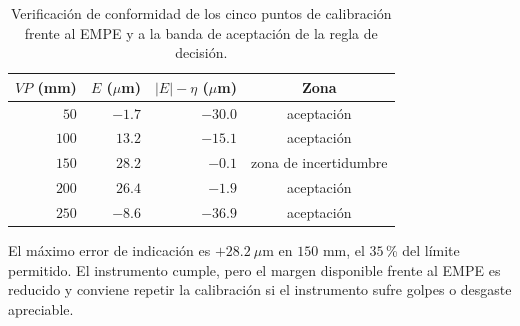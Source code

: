 \begin{table}[H]
\centering
\caption{Verificación de conformidad de los cinco puntos de calibración frente al
EMPE y a la banda de aceptación de la regla de decisión.}
\label{tab:pie-rey-conformidad}
\begin{tabular}{rrrc}
\toprule
$VP$ (mm) & $E$ ($\mu$m) & $|E| - \eta$ ($\mu$m) & Zona \\
\midrule
$50$  & $-1.7$ & $-30.0$ & aceptación \\
$100$ & $13.2$ & $-15.1$ & aceptación \\
$150$ & $28.2$ & $-0.1$   & zona de incertidumbre \\
$200$ & $26.4$ & $-1.9$   & aceptación \\
$250$ & $-8.6$ & $-36.9$ & aceptación \\
\bottomrule
\end{tabular}
\end{table}

El máximo error de indicación es $+28.2\ \mu\text{m}$ en $150$ mm, el $35$\,\% del
límite permitido. El instrumento cumple, pero el margen disponible frente al EMPE es
reducido y conviene repetir la calibración si el instrumento sufre golpes o desgaste
apreciable.
